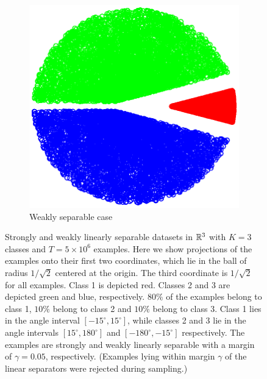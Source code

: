 \begin{figure}[h]
\begin{subfigure}[b]{0.23\textwidth}
\centering
\hspace*{-0.3cm}  \includegraphics[width=1.15\textwidth, trim={0, 0cm, 0, 0}, clip]{figures/weak_points}
\caption{Weakly separable case}
\label{figure:weakly-separable-dataset}
\end{subfigure}
\vspace*{-0.2cm}
\caption{Strongly and weakly linearly separable datasets in $\mathbb{R}^3$ with $K=3$
classes and $T=5\times 10^6$ examples. Here we show projections of the examples
onto their first two coordinates, which lie in the ball of radius $1/\sqrt{2}$
centered at the origin. The third coordinate is $1/\sqrt{2}$ for all examples.
Class 1 is depicted red. Classes 2 and 3 are depicted green and blue,
respectively. $80\%$ of the examples belong to class 1, $10\%$ belong to class 2
and $10\%$ belong to class 3. Class 1 lies in the angle interval $[-15^\circ,
15^\circ]$, while classes 2 and 3 lie in the angle intervals $[15^\circ,
180^\circ]$ and $[-180^\circ, -15^\circ]$ respectively. The examples are
strongly and weakly linearly separable with a margin of $\gamma=0.05$,
respectively. (Examples lying within margin $\gamma$ of the linear separators
were rejected during sampling.)}
\label{figure:strongly-and-weakly-separable-datasets}
\end{figure}

